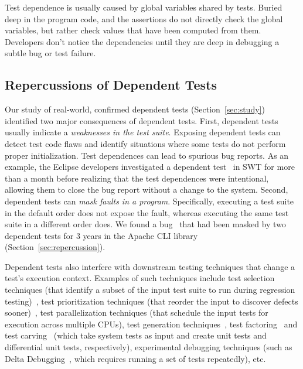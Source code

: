 Test dependence is usually caused by
global variables shared by tests.
Buried deep in the program code, and the assertions
do not directly check the global variables,
but rather check values that have been computed from
them.
Developers don't notice the dependencies until they are deep in debugging a
subtle bug or test failure.


\subsection{Repercussions of Dependent Tests}


Our study of \dtnum real-world, confirmed dependent
tests 
(Section~\ref{sec:study}) identified two 
major consequences of dependent tests.
%
First, dependent tests usually indicate a
\emph{weaknesses in the test suite}. Exposing
dependent tests can detect test code flaws and identify situations
where some tests do not perform proper initialization.
Test dependences can lead
to {spurious bug reports}. As an example, the Eclipse developers
investigated a dependent test~\cite{eclipsebug} in SWT for
more than a month before realizing that the test dependences were intentional,
allowing them to close the bug report without a change to the system.
%
Second, dependent tests can
\emph{mask faults in a program}. Specifically, executing a test suite in the
default order does not expose the fault, whereas
executing the same test suite in a different order does. We found 
a bug~\cite{clibug} that had been masked by two dependent tests
for 3 years in the Apache CLI library~\cite{cli} (Section~\ref{sec:repercussion}).


Dependent tests also interfere with downstream testing
techniques that change a test's execution context.
Examples of such techniques include
test selection techniques (that identify a subset of
the input test suite to run during
regression testing)~\cite{harroldetal:OOPSLA:2001},
test prioritization techniques (that reorder the
input to discover defects sooner)~\cite{Elbaum:2000:PTC:347324.348910},
test parallelization techniques (that schedule the input tests for execution across multiple
CPUs), test generation techniques~\cite{PachecoLET2007, SPLAT},
test factoring~\cite{Saff:2005} and test carving~\cite{Elbaum:2006} (which take system tests as
input and create unit tests and differential unit tests,
respectively), experimental debugging techniques (such as Delta Debugging~\cite{Zeller:2002},
which requires running a set of tests repeatedly), etc. 

